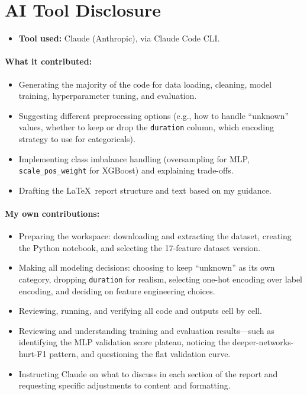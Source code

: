 \documentclass[11pt, a4paper]{article}
\begin{document}
\section{AI Tool Disclosure}

\begin{itemize}[nosep]
    \item \textbf{Tool used:} Claude (Anthropic), via Claude Code CLI.
\end{itemize}

\paragraph{What it contributed:}
\begin{itemize}[nosep]
    \item Generating the majority of the code for data loading, cleaning,
          model training, hyperparameter tuning, and evaluation.
    \item Suggesting different preprocessing options (e.g., how to handle
          ``unknown'' values, whether to keep or drop the \texttt{duration}
          column, which encoding strategy to use for categoricals).
    \item Implementing class imbalance handling (oversampling for MLP,
          \texttt{scale\_pos\_weight} for XGBoost) and explaining trade-offs.
    \item Drafting the \LaTeX\ report structure and text based on my guidance.
\end{itemize}

\paragraph{My own contributions:}
\begin{itemize}[nosep]
    \item Preparing the workspace: downloading and extracting the dataset,
          creating the Python notebook, and selecting the 17-feature dataset
          version.
    \item Making all modeling decisions: choosing to keep ``unknown'' as its
          own category, dropping \texttt{duration} for realism, selecting
          one-hot encoding over label encoding, and deciding on feature
          engineering choices.
    \item Reviewing, running, and verifying all code and outputs cell by cell.
    \item Reviewing and understanding training and evaluation results---such as
          identifying the MLP validation score plateau, noticing the
          deeper-networks-hurt-F1 pattern, and questioning the flat
          validation curve.
    \item Instructing Claude on what to discuss in each section of the report
          and requesting specific adjustments to content and formatting.
\end{itemize}
\end{document}
